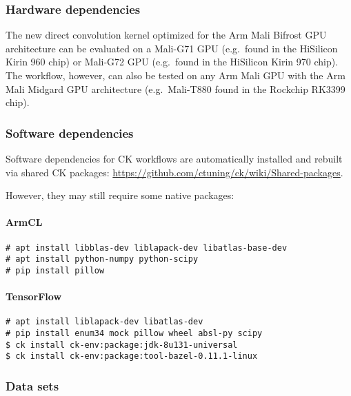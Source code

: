 \subsubsection{Hardware dependencies}

The new direct convolution kernel optimized for the Arm Mali Bifrost GPU
architecture can be evaluated on a Mali-G71 GPU (e.g.\ found in the HiSilicon
Kirin 960 chip) or Mali-G72 GPU (e.g.\ found in the HiSilicon Kirin 970 chip).
%
The workflow, however, can also be tested on any Arm Mali GPU with the Arm Mali
Midgard GPU architecture (e.g.\ Mali-T880 found in the Rockchip RK3399 chip).

\subsubsection{Software dependencies}

Software dependencies for CK workflows are automatically installed and rebuilt 
via shared CK packages: \url{https://github.com/ctuning/ck/wiki/Shared-packages}.

However, they may still require some native packages:

\paragraph{ArmCL}

\begin{verbatim}
# apt install libblas-dev liblapack-dev libatlas-base-dev
# apt install python-numpy python-scipy
# pip install pillow
\end{verbatim}

\paragraph{TensorFlow}

\begin{verbatim}
# apt install liblapack-dev libatlas-dev
# pip install enum34 mock pillow wheel absl-py scipy
$ ck install ck-env:package:jdk-8u131-universal
$ ck install ck-env:package:tool-bazel-0.11.1-linux
\end{verbatim}

\subsubsection{Data sets}

